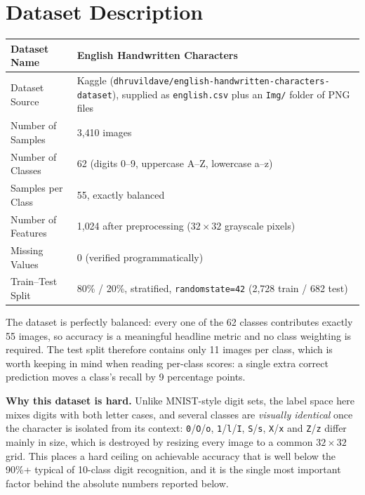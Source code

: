 \documentclass[12pt,a4paper]{article}
\DeclareRobustCommand{\_}{\textunderscore\allowbreak}
\begin{document}
\section{Dataset Description}
\begin{longtable}{|p{6cm}|p{8cm}|}
\hline
Dataset Name & English Handwritten Characters \\ \hline
Dataset Source & Kaggle (\texttt{dhruvildave/\allowbreak english-\allowbreak handwritten-\allowbreak characters-\allowbreak dataset}),
supplied as \texttt{english.csv} plus an \texttt{Img/} folder of PNG files \\ \hline
Number of Samples & 3{,}410 images \\ \hline
Number of Classes & 62 (digits 0--9, uppercase A--Z, lowercase a--z) \\ \hline
Samples per Class & 55, exactly balanced \\ \hline
Number of Features & 1{,}024 after preprocessing ($32 \times 32$ grayscale pixels) \\ \hline
Missing Values & 0 (verified programmatically) \\ \hline
Train--Test Split & 80\% / 20\%, stratified, \texttt{random\_state=42}
(2{,}728 train / 682 test) \\ \hline
\end{longtable}

The dataset is perfectly balanced: every one of the 62 classes contributes
exactly 55 images, so accuracy is a meaningful headline metric and no class
weighting is required. The test split therefore contains only 11 images per
class, which is worth keeping in mind when reading per-class scores: a single
extra correct prediction moves a class's recall by 9 percentage points.

\textbf{Why this dataset is hard.} Unlike MNIST-style digit sets, the label
space here mixes digits with both letter cases, and several classes are
\emph{visually identical} once the character is isolated from its context:
\texttt{0}/\texttt{O}/\texttt{o}, \texttt{1}/\texttt{l}/\texttt{I},
\texttt{S}/\texttt{s}, \texttt{X}/\texttt{x} and \texttt{Z}/\texttt{z} differ
mainly in size, which is destroyed by resizing every image to a common
$32\times32$ grid. This places a hard ceiling on achievable accuracy that is
well below the 90\%+ typical of 10-class digit recognition, and it is the
single most important factor behind the absolute numbers reported below.
\end{document}
